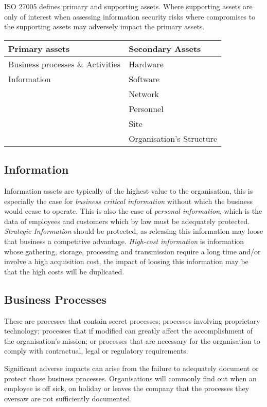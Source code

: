 ISO 27005 defines primary and supporting assets. Where supporting assets are only of interest when assessing information security risks where compromises to the supporting assets may adversely impact the primary assets.
\begin{table}[H]
    \centering
    \begin{tabularx}{0.6\textwidth}{XX}
        \textbf{Primary assets} & \textbf{Secondary Assets}\\
        \hline
        Business processes \& Activities & Hardware\\
        Information & Software\\
         & Network\\
         & Personnel\\
         & Site\\
         & Organisation's Structure\\
    \end{tabularx}
\end{table}
\subsection*{Information}
Information assets are typically of the highest value to the organisation, this is especially the case for \textit{business critical information} without which the business would cease to operate. This is also the case of \textit{personal information}, which is the data of employees and customers which by law must be adequately protected. \textit{Strategic Information} should be protected, as releasing this information may loose that business a competitive advantage. \textit{High-cost information} is information whose gathering, storage, processing and transmission require a long time and/or involve a high acquisition cost, the impact of loosing this information may be that the high costs will be duplicated. 
\subsection*{Business Processes}
These are processes that contain secret processes; processes involving proprietary technology; processes that if modified can greatly affect the accomplishment of the organisation's mission; or processes that are necessary for the organisation to comply with contractual, legal or regulatory requirements. 

Significant adverse impacts can arise from the failure to adequately document or protect those business processes. Organisations will commonly find out when an employee is off sick, on holiday or leaves the company that the processes they oversaw are not sufficiently documented.

